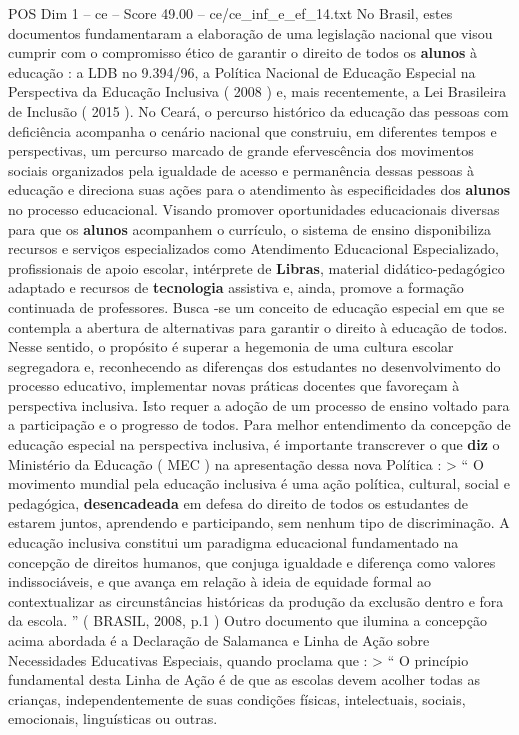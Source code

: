 \begin{textsample}{POS Dim 1 – ce – Score 49.00 – ce/ce\_inf\_e\_ef\_14.txt}
No Brasil, estes documentos fundamentaram a elaboração de uma legislação nacional que visou cumprir com o compromisso ético de garantir o direito de todos os \textbf{alunos} à educação : a LDB no 9.394/96, a Política Nacional de Educação Especial na Perspectiva da Educação Inclusiva ( 2008 ) e, mais recentemente, a Lei Brasileira de Inclusão ( 2015 ).
No Ceará, o percurso histórico da educação das pessoas com deficiência acompanha o cenário nacional que construiu, em diferentes tempos e perspectivas, um percurso marcado de grande efervescência dos movimentos sociais organizados pela igualdade de acesso e permanência dessas pessoas à educação e direciona suas ações para o atendimento às especificidades dos \textbf{alunos} no processo educacional.
Visando promover oportunidades educacionais diversas para que os \textbf{alunos} acompanhem o currículo, o sistema de ensino disponibiliza recursos e serviços especializados como Atendimento Educacional Especializado, profissionais de apoio escolar, intérprete de \textbf{Libras}, material didático-pedagógico adaptado e recursos de \textbf{tecnologia} assistiva e, ainda, promove a formação continuada de professores.
Busca -se um conceito de educação especial em que se contempla a abertura de alternativas para garantir o direito à educação de todos.
Nesse sentido, o propósito é superar a hegemonia de uma cultura escolar segregadora e, reconhecendo as diferenças dos estudantes no desenvolvimento do processo educativo, implementar novas práticas docentes que favoreçam à perspectiva inclusiva.
Isto requer a adoção de um processo de ensino voltado para a participação e o progresso de todos.
Para melhor entendimento da concepção de educação especial na perspectiva inclusiva, é importante transcrever o que \textbf{diz} o Ministério da Educação ( MEC ) na apresentação dessa nova Política : > “ O movimento mundial pela educação inclusiva é uma ação política, cultural, social e pedagógica, \textbf{desencadeada} em defesa do direito de todos os estudantes de estarem juntos, aprendendo e participando, sem nenhum tipo de discriminação.
A educação inclusiva constitui um paradigma educacional fundamentado na concepção de direitos humanos, que conjuga igualdade e diferença como valores indissociáveis, e que avança em relação à ideia de equidade formal ao contextualizar as circunstâncias históricas da produção da exclusão dentro e fora da escola. ” ( BRASIL, 2008, p.1 ) Outro documento que ilumina a concepção acima abordada é a Declaração de Salamanca e Linha de Ação sobre Necessidades Educativas Especiais, quando proclama que : > “ O princípio fundamental desta Linha de Ação é de que as escolas devem acolher todas as crianças, independentemente de suas condições físicas, intelectuais, sociais, emocionais, linguísticas ou outras.

\end{textsample}
